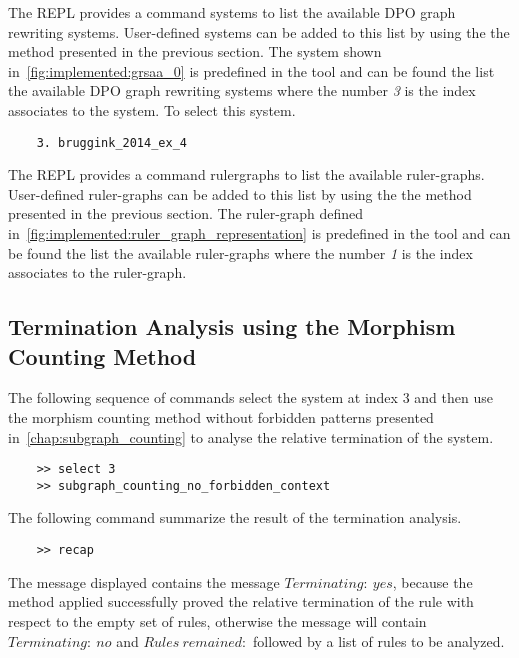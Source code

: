 The REPL provides a command \colorbox{Ivory2}{systems} to list the available DPO graph rewriting systems. User-defined systems can be added to this list by using the the method presented in the previous section. The system shown in~\autoref{fig:implemented:grsaa_0} is predefined in the tool and can be found the list the available DPO graph rewriting systems where the number \textit{3} is the index associates to the system. To select this system.
\begin{verbatim}
    3. bruggink_2014_ex_4
\end{verbatim}

The REPL provides a command \colorbox{Ivory2}{rulergraphs} to list the available ruler-graphs. User-defined ruler-graphs can be added to this list by using the the method presented in the previous section. The ruler-graph defined in~\autoref{fig:implemented:ruler_graph_representation} is predefined in the tool and can be found the list the available ruler-graphs where the number \textit{1} is the index associates to the ruler-graph. 

\subsection{Termination Analysis using the Morphism Counting Method}
The following sequence of commands select the system at index 3 and then use the morphism counting method without forbidden patterns presented in~\autoref{chap:subgraph_counting} to analyse the relative termination of the system.
\begin{verbatim}
    >> select 3
    >> subgraph_counting_no_forbidden_context
\end{verbatim}
The following command summarize the result of the termination analysis.
 \begin{verbatim}
    >> recap
\end{verbatim}
The message displayed contains the message \colorbox{Ivory2}{$Terminating:\ yes$}, because the method applied successfully proved the relative termination of the rule with respect to the empty set of rules, otherwise the message will contain \colorbox{Ivory2}{$Terminating:\ no$} and \colorbox{Ivory2}{$Rules\ remained:$} followed by a list of rules to be analyzed.


